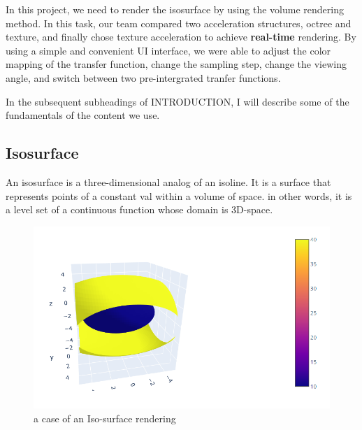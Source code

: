 \documentclass[sigconf]{acmart}
\begin{document}
\maketitle


In this project, we need to render the isosurface by using the volume rendering method. In this task, our team compared two acceleration structures, octree and texture, and finally chose texture acceleration to achieve \textbf{real-time} rendering. By using a simple and convenient UI interface, we were able to adjust the color mapping of the transfer function, change the sampling step, change the viewing angle, and switch between two pre-intergrated tranfer functions.

In the subsequent subheadings of INTRODUCTION, I will describe some of the fundamentals of the content we use.

\subsection{Isosurface}
An isosurface is a three-dimensional analog of an isoline. It is a surface that represents points of a constant val within a volume of space. in other words, it is a level set of a continuous function whose domain is 3D-space.

\begin{figure}
    \centering
    \includegraphics[scale=0.4]{../imgs/isosurface.png}
    \caption{a case of an Iso-surface rendering}
    \label{fig:isocase}
\end{figure}
\end{document}
